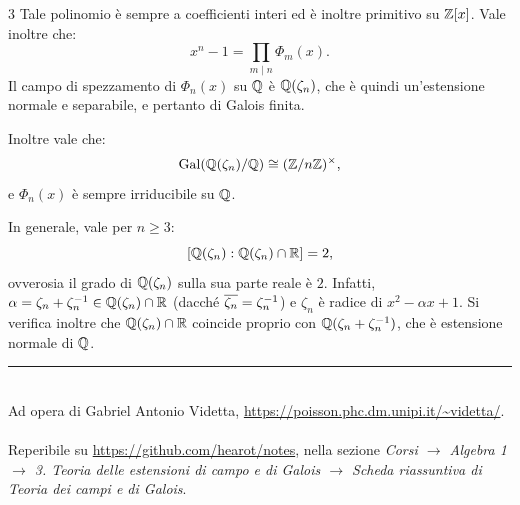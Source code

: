 \documentclass[10pt,landscape]{article}
\begin{document}
\begin{multicols}{3}
	Tale polinomio è sempre a coefficienti interi ed è inoltre primitivo
	su $\mathbb Z[x]$. Vale inoltre che:
	\[ x^n - 1 = \prod_{m \mid n} \Phi_m(x). \]
	Il campo di spezzamento di $\Phi_n(x)$ su $\mathbb Q$ è
	$\mathbb Q(\zeta_n)$, che è quindi un'estensione normale e separabile,
	e pertanto di Galois finita. \smallskip

	Inoltre vale che:
	\[ \operatorname{Gal}(\mathbb Q(\zeta_n)/\mathbb Q) \cong (\mathbb Z /{n} \mathbb Z)^\times, \]
	e $\Phi_n(x)$ è sempre irriducibile su $\mathbb Q$. \smallskip

	In generale, vale per $n \geq 3$:
	\[
		[\mathbb Q(\zeta_n) : \mathbb Q(\zeta_n) \cap \mathbb R] = 2,
	\]
	ovverosia il grado di $\mathbb Q(\zeta_n)$ sulla sua parte reale è $2$.
	Infatti, $\alpha = \zeta_n + \zeta_n^{-1} \in \mathbb Q(\zeta_n) \cap \mathbb R$ (dacché
	$\overline{\zeta_n} = \zeta_n^{-1}$) e $\zeta_n$ è radice di
	$x^2 - \alpha x + 1$. Si verifica inoltre che
	$\mathbb Q(\zeta_n) \cap \mathbb R$ coincide proprio con $\mathbb Q(\zeta_n + \zeta_n^{-1})$, che è
	estensione normale di $\mathbb Q$.

	\vfill
	\hrule
	~\\
	Ad opera di Gabriel Antonio Videtta, \url{https://poisson.phc.dm.unipi.it/~videtta/}.
	~\\Reperibile su
	\url{https://github.com/hearot/notes}, nella sezione \textit{Corsi $\to$ Algebra 1 $\to$ 3. Teoria delle estensioni di campo e di Galois $\to$ Scheda riassuntiva di Teoria dei campi e di Galois}.
\end{multicols}
\end{document}

